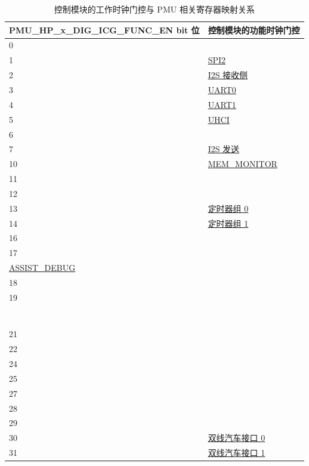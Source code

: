 \documentclass[main\_\_CN.tex]{subfiles}
\begin{document}
\begin{table}[H]
    \centering
    \caption{控制模块的工作时钟门控与 PMU 相关寄存器映射关系}\label{tab:clk_pmu_func}
\begin{tabular}{|l|l|}
\hline
\rowcolor{lightgray}
PMU\_HP\_x\_DIG\_ICG\_FUNC\_EN bit 位 & 控制模块的功能时钟门控 \\ \hline
0   & \nameref{mod:dma}\\ \hline
1   & \hyperref[mod:spi]{SPI2}\\ \hline
2   & \hyperref[mod:i2s]{I2S 接收侧}\\ \hline
3   & \hyperref[mod:uart]{UART0}\\ \hline
4   & \hyperref[mod:uart]{UART1}\\ \hline
5   & \hyperref[mod:uart]{UHCI}\\ \hline
6   & \nameref{mod:usbserialjtag}\\ \hline
7   & \hyperref[mod:i2s]{I2S 发送}\\ \hline
10  & \hyperref[mod:dbgassist]{MEM\_MONITOR}\\ \hline
11  & \nameref{mod:sdioslave}\\ \hline
12  & \nameref{mod:tmpsen}\\ \hline
13  & \hyperref[mod:timg]{定时器组 0}\\ \hline
14  & \hyperref[mod:timg]{定时器组 1}\\ \hline
16  & \nameref{mod:evntaskmatrix}\\ \hline
17  & \makecell[l]{\nameref{mod:riscvcpu}\\\hyperref[mod:dbgassist]{ASSIST\_DEBUG}}\\ \hline
18  & \nameref{mod:systimer}\\ \hline
19  & \makecell[l]{\nameref{mod:aes}\\\nameref{mod:sha}\\\nameref{mod:rsa}\\\nameref{mod:ecc}\\\nameref{mod:digsig}\\\nameref{mod:hmac}\\\nameref{mod:ecdsa}\\\nameref{mod:keymng}} \\ \hline
21  & \nameref{mod:rmt}\\ \hline
22  & \nameref{mod:mcpwm}\\ \hline
24  & \nameref{mod:bitscrm}\\ \hline
25  & \nameref{mod:parlio} \\ \hline
27  & \nameref{mod:ledpwm}   \\ \hline
28  & \nameref{mod:iomuxgpio}   \\ \hline
29  & \nameref{mod:i2c}   \\ \hline
30  & \hyperref[mod:twai]{双线汽车接口 0} \\ \hline
31  & \hyperref[mod:twai]{双线汽车接口 1} \\ \hline
\end{tabular}
\end{table}
\end{document}
